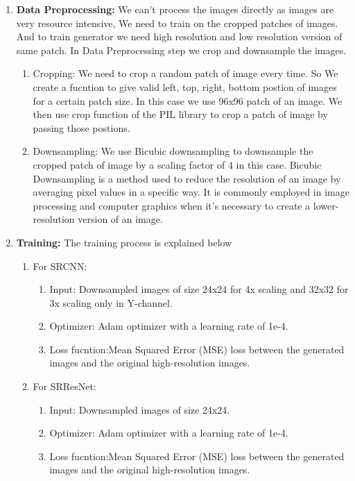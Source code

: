 \begin{enumerate}
    \item {\bf Data Preprocessing:} We can't process the images directly as images are very resource intensive, We need to train on the cropped patches of images. And to train generator we need high resolution and low resolution version of same patch. In Data Preprocessing step we crop and downsample the images. 
    \begin{enumerate}
        \item Cropping: We need to crop a random patch of image every time. So We create a fucntion to give  valid left, top, right, bottom postion of images for a certain patch size. In this case we use 96x96 patch of an image. We then use crop function of the PIL library to crop a patch of image by passing those postions.
        \item Downsampling: We use Bicubic downsampling  to downsample the cropped patch of image by a scaling factor of 4 in this case. Bicubic Downsampling is a method used to reduce the resolution of an image by averaging pixel values in a specific way. It is commonly employed in image processing and computer graphics when it's necessary to create a lower-resolution version of an image.
    \end{enumerate}
    \item {\bf Training:} The training process is explained below
    \begin{enumerate}
        \item For SRCNN:
        \begin{enumerate}
            \item Input: Downsampled images of size 24x24 for 4x scaling and 32x32 for 3x scaling only in Y-channel.
            \item Optimizer: Adam optimizer with a learning rate of 1e-4.
            \item Loss fucntion:Mean Squared Error (MSE) loss between the generated images and the original high-resolution images.
        \end{enumerate}
        \item For SRResNet:
        \begin{enumerate}
            \item Input: Downsampled images of size 24x24.
            \item Optimizer: Adam optimizer with a learning rate of 1e-4.
            \item Loss fucntion:Mean Squared Error (MSE) loss between the generated images and the original high-resolution images.

\end{enumerate}
\end{enumerate}
\end{enumerate}
